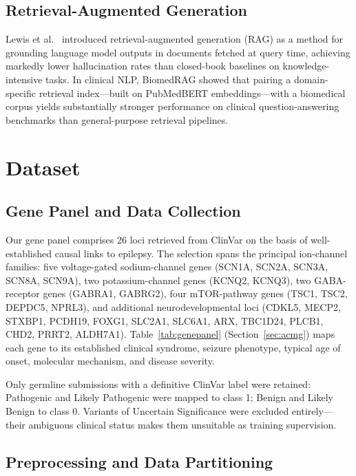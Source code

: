 \documentclass[12pt,a4paper]{article}
\begin{document}
\subsection{Retrieval-Augmented Generation}

Lewis et al.\ \cite{lewis2020rag} introduced retrieval-augmented
generation (RAG) as a method for grounding language model outputs
in documents fetched at query time, achieving markedly lower
hallucination rates than closed-book baselines on knowledge-intensive
tasks. In clinical NLP, BiomedRAG \cite{biomedrag2024} showed that
pairing a domain-specific retrieval index---built on PubMedBERT
\cite{pubmedbert2021} embeddings---with a biomedical corpus yields
substantially stronger performance on clinical question-answering
benchmarks than general-purpose retrieval pipelines.

\section{Dataset}

\subsection{Gene Panel and Data Collection}

Our gene panel comprises 26 loci retrieved from ClinVar
\cite{clinvar2018} on the basis of well-established causal links
to epilepsy. The selection spans the principal ion-channel
families: five voltage-gated sodium-channel genes (SCN1A, SCN2A,
SCN3A, SCN8A, SCN9A), two potassium-channel genes (KCNQ2, KCNQ3),
two GABA-receptor genes (GABRA1, GABRG2), four mTOR-pathway genes
(TSC1, TSC2, DEPDC5, NPRL3), and additional neurodevelopmental loci
(CDKL5, MECP2, STXBP1, PCDH19, FOXG1, SLC2A1, SLC6A1,
ARX, TBC1D24, PLCB1, CHD2, PRRT2, ALDH7A1).
Table~\ref{tab:genepanel} (Section~\ref{sec:acmg}) maps each gene
to its established clinical syndrome, seizure phenotype, typical
age of onset, molecular mechanism, and disease severity.

Only germline submissions with a definitive ClinVar label were
retained: Pathogenic and Likely Pathogenic were mapped to class 1;
Benign and Likely Benign to class 0. Variants of Uncertain
Significance were excluded entirely---their ambiguous clinical
status makes them unsuitable as training supervision.

\subsection{Preprocessing and Data Partitioning}
\end{document}
